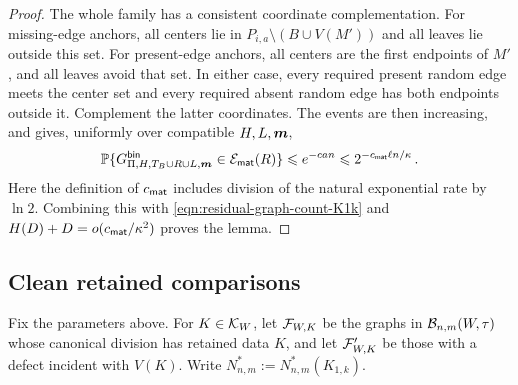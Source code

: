 \begin{proof}
The whole family has a consistent coordinate complementation. For missing-edge anchors, all centers lie in $P_{i,a}\setminus(B\cup V(M'))$ and all leaves lie outside this set. For present-edge anchors, all centers are the first endpoints of $M'$, and all leaves avoid that set. In either case, every required present random edge meets the center set and every required absent random edge has both endpoints outside it. Complement the latter coordinates. The events are then increasing, and  gives, uniformly over compatible $H,L,\boldsymbol{m}$,
\begin{equation}\label{eqn:residual-matching-janson-bound-K1k}
{\mathbb P}\{G^{\mathsf{bin}}_{\Pi,H,T_B\cup R\cup L,\boldsymbol{m}}\in{\mathcal E}_{\mathsf{mat}}(R)\}\leqslant e^{-c a n}\leqslant2^{-c_{\mathsf{mat}}\ell n/\kappa}\,.
\end{equation}
Here the definition of $c_{\mathsf{mat}}$ includes division of the natural exponential rate by $\ln2$. Combining this with \eqref{eqn:residual-graph-count-K1k} and $H(D)+D=o(c_{\mathsf{mat}}/\kappa^2)$ proves the lemma.
\end{proof}

\subsection{Clean retained comparisons}\label{subsec:clean-retained}
Fix the parameters above. For $K\in{\mathcal K}_W$, let ${\mathcal F}_{W,K}$ be the graphs in ${\mathcal B}_{n,m}(W,\tau)$ whose canonical division has retained data $K$, and let ${\mathcal F}'_{W,K}$ be those with a defect incident with $V(K)$. Write $N^\ast_{n,m}:=N^\ast_{n,m}(K_{1,k})$.

